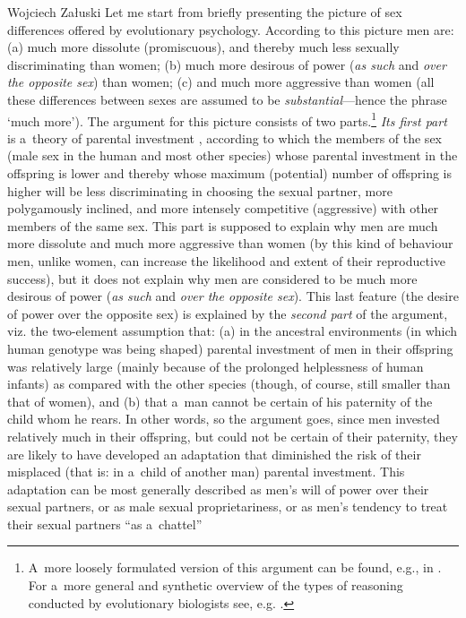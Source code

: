\begin{artengenv}{Wojciech Załuski}
Let me start from briefly presenting the picture of sex differences offered by evolutionary psychology. According to this picture men are: (a) much more dissolute (promiscuous), and thereby much less sexually discriminating than women; (b) much more desirous of power (\textit{as such} and \textit{over the opposite sex}) than women; (c) and much more aggressive than women (all these differences between sexes are assumed to be \textit{substantial}---hence the phrase ‘much more'). The argument for this picture consists of two parts.\footnote{A~more loosely formulated version of this argument can be found, e.g., in
\parencites[][]{ridley_red_1994}[][]{crawford_psychology_1998}. %
 For a~more general and synthetic overview of the types of reasoning conducted by evolutionary biologists see, e.g. 
\parencite[][]{kozlowski_ewolucja_2018}.%
} \textit{Its first part} is a~theory of parental investment 
\parencite[cf.][]{trivers_parental_1972}, %
 according to which the members of the sex (male sex in the human and most other species) whose parental investment in the offspring is lower and thereby whose maximum (potential) number of offspring is higher will be less discriminating in choosing the sexual partner, more polygamously inclined, and more intensely competitive (aggressive) with other members of the same sex. This part is supposed to explain why men are much more dissolute and much more aggressive than women (by this kind of behaviour men, unlike women, can increase the likelihood and extent of their reproductive success), but it does not explain why men are considered to be much more desirous of power (\textit{as such} and \textit{over the opposite sex}). This last feature (the desire of power over the opposite sex) is explained by the \textit{second part} of the argument, viz. the two-element assumption that: (a) in the ancestral environments (in which human genotype was being shaped) parental investment of men in their offspring was relatively large (mainly because of the prolonged helplessness of human infants) as compared with the other species (though, of course, still smaller than that of women), and (b) that a~man cannot be certain of his paternity of the child whom he rears. In other words, so the argument goes, since men invested relatively much in their offspring, but could not be certain of their paternity, they are likely to have developed an adaptation that diminished the risk of their misplaced (that is: in a~child of another man) parental investment. This adaptation can be most generally described as men's will of power over their sexual partners, or as male sexual proprietariness, or as men's tendency to treat their sexual partners ``as a~chattel'' 

\end{artengenv}
